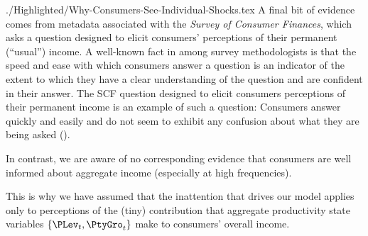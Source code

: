 \begin{verbatimwrite}{./Highlighted/Why-Consumers-See-Individual-Shocks.tex}
  A final bit of evidence comes from metadata associated with the \textit{Survey of Consumer Finances}, which asks a question designed to elicit consumers' perceptions of their permanent (``usual'') income.  A well-known fact in among survey methodologists is that the speed and ease with which consumers answer a question is an indicator of the extent to which they have a clear understanding of the question and are confident in their answer.  The SCF question designed to elicit consumers perceptions of their permanent income is an example of such a question: Consumers answer quickly and easily and do not seem to exhibit any confusion about what they are being asked (\cite{kennickellPermanent}).

  In contrast, we are aware of no corresponding evidence that consumers are well informed about aggregate income (especially at high frequencies).%
\end{verbatimwrite}%

This is why we have assumed that the inattention that drives our model applies only to perceptions of the (tiny) contribution that aggregate productivity state variables $\{\PLev_t,\PtyGro_t\}$ make to consumers' overall income.

